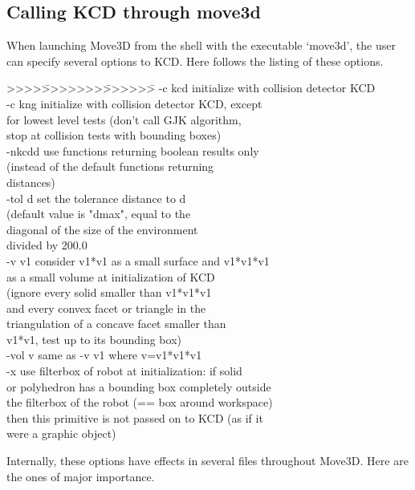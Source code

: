 \subsection{Calling KCD through move3d}
When launching Move3D from the shell with the executable `move3d', the
user can specify several options to KCD. Here follows the listing of
these options.

\begin{tabbing}
\vspace{-5mm}
>>>>\=>>>>>>>\=>>>>>>\= \kill
\>-c \>kcd  \>initialize with collision detector KCD\\

\>-c \>kng  \>initialize with collision detector KCD, except\\
\>\>\>        for lowest level tests (don't call GJK algorithm,\\
\>\>\>        stop at collision tests with bounding boxes)\\

\>-nkcdd \> \>use functions returning boolean results only\\
\>\>\>        (instead of the default functions returning \\
\>\>\>        distances)\\

\>-tol \>d  \>set the tolerance distance to  d\\
\>\>\>        (default value is "dmax", equal to the\\
\>\>\>        diagonal of the size of the environment\\
\>\>\>        divided by 200.0\\

\>-v \>v1   \>consider v1*v1 as a small surface and v1*v1*v1\\
\>\>\>        as a small volume at initialization of KCD\\
\>\>\>        (ignore every solid smaller than v1*v1*v1\\
\>\>\>        and every convex facet or triangle in the \\
\>\>\>        triangulation of a concave facet smaller than\\
\>\>\>        v1*v1, test up to its bounding box)\\

\>-vol \>v  \>same as -v v1  where v=v1*v1*v1\\

\>-x  \>    \>use filterbox of robot at initialization: if solid\\
\>\>\>        or polyhedron has a bounding box completely outside\\
\>\>\>        the filterbox of the robot (== box around workspace)\\
\>\>\>        then this primitive is not passed on to KCD (as if it\\
\>\>\>        were a graphic object)
\vspace{-4mm}
\end{tabbing}
Internally, these options have effects in several files throughout
Move3D. Here are the ones of major importance.
